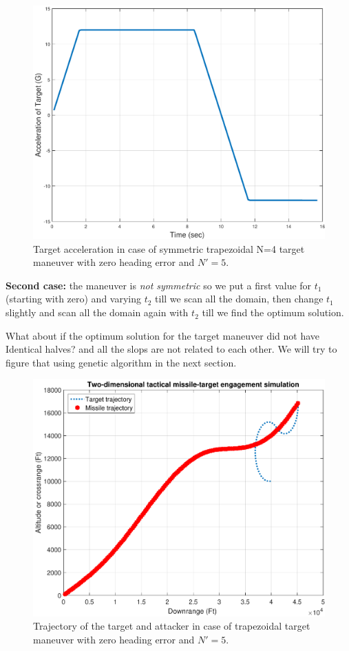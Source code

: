 \begin{figure}[H]
	\centering
	\includegraphics[scale = 0.35]{fig/TargetAccelerationTrapSym.pdf}
	\caption{Target acceleration in case of symmetric trapezoidal N=4 target maneuver with zero heading error and $N'=5$.}
	\label{Target acceleration trapSymm}
\end{figure}


\textbf{Second case:} the maneuver is \textit{not symmetric} so we put a first value for $t_1$ (starting with zero) and varying $t_2$ till we scan all the domain, then change $t_1$ slightly and scan all the domain again with $t_2$ till we find the optimum solution.

What about if the optimum solution for the target maneuver did not have Identical halves? and all the slops are not related to each other. We will try to figure that using genetic algorithm in the next section. 


\begin{figure}[htb]
	\centering
	\includegraphics[scale = 0.35]{fig/trajectoryTrap.pdf}
	\caption{Trajectory of the target and attacker in case of trapezoidal target maneuver with zero heading error and $N'=5$.}
	\label{trajectory trap}
\end{figure}


